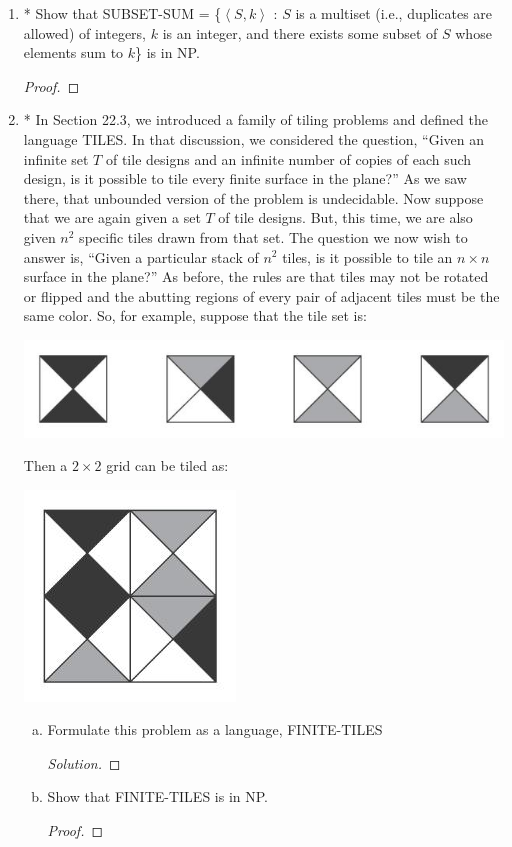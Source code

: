\documentclass[10pt]{article}
\newcommand{\brackets}[1]{\left< #1 \right>}
\begin{document}
\begin{enumerate}[1)]

\item
* Show that SUBSET-SUM = \{$\brackets{S, k}$ : $S$ is a multiset (i.e., duplicates are allowed) of integers, $k$ is an integer, and
there exists some subset of $S$ whose elements sum to $k$\} is in NP.
\begin{proof}[Proof]
\end{proof}


\item
* In Section 22.3, we introduced a family of tiling problems and defined the language TILES.  In that discussion, we considered the question, “Given an infinite set $T$ of tile designs and an infinite number of copies of each such design, is it possible to tile every finite surface in the plane?”  As we saw there, that unbounded version of the problem is undecidable.  Now suppose that we are again given a set $T$ of tile designs.  But, this time, we are also given $n^2$ specific tiles drawn from that set.  The question we now wish to answer is, “Given a particular stack of $n^2$ tiles, is it possible to tile an $n \times n$ surface in the plane?”  As before, the rules are that tiles may not be rotated or flipped and the abutting regions of every pair of adjacent tiles must be the same color.  So, for example, suppose that the tile set is:\\
\begin{center}
\includegraphics[scale=.5]{images/tileset.jpg}
\end{center}
Then a $2 \times 2$ grid can be tiled as:\\
\begin{center}
\includegraphics[scale=.5]{images/tiling.jpg}
\end{center}
\begin{enumerate}[a)]
\item
Formulate this problem as a language, FINITE-TILES
\begin{proof}[Solution]
\end{proof}
\item
Show that FINITE-TILES is in NP.
\begin{proof}[Proof]
\end{proof}
\end{enumerate}
\end{enumerate}
\end{document}
